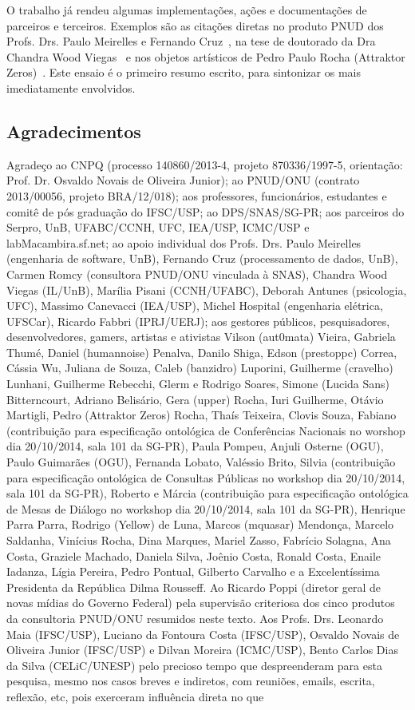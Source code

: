 \documentclass[a4paper, 11pt]{article} %
\begin{document}
O trabalho já rendeu algumas implementações, ações e documentações de parceiros e terceiros. Exemplos são as citações diretas no produto PNUD dos Profs. Drs. Paulo Meirelles e Fernando Cruz~\cite{paulo6}, na tese de doutorado da Dra Chandra Wood Viegas~\cite{chandra} e nos objetos artísticos de Pedro Paulo Rocha (Attraktor Zeros)~\cite{pedro}. Este ensaio é o primeiro resumo escrito, para sintonizar os mais imediatamente envolvidos.

\subsection*{Agradecimentos}
Agradeço ao CNPQ (processo 140860/2013-4, projeto 870336/1997-5, orientação: Prof. Dr. Osvaldo Novais de Oliveira Junior); ao PNUD/ONU (contrato 2013/00056, projeto BRA/12/018); aos professores, funcionários, estudantes e comitê de pós graduação do IFSC/USP; ao DPS/SNAS/SG-PR; aos parceiros do Serpro, UnB, UFABC/CCNH, UFC, IEA/USP, ICMC/USP e labMacambira.sf.net; ao apoio individual dos Profs. Drs. Paulo Meirelles (engenharia de software, UnB), Fernando Cruz (processamento de dados, UnB), Carmen Romcy (consultora PNUD/ONU vinculada à SNAS), Chandra Wood Viegas (IL/UnB), Marília Pisani (CCNH/UFABC), Deborah Antunes (psicologia, UFC), Massimo Canevacci (IEA/USP), Michel Hospital (engenharia elétrica, UFSCar), Ricardo Fabbri (IPRJ/UERJ); aos gestores públicos, pesquisadores, desenvolvedores, gamers, artistas e ativistas Vilson (aut0mata) Vieira, Gabriela Thumé, Daniel (humannoise) Penalva, Danilo Shiga, Edson (prestoppc) Correa, Cássia Wu, Juliana de Souza, Caleb (banzidro) Luporini, Guilherme (cravelho) Lunhani, Guilherme Rebecchi, Glerm e Rodrigo Soares, Simone (Lucida Sans) Bitterncourt, Adriano Belisário, Gera (upper) Rocha, Iuri Guilherme, Otávio Martigli, Pedro (Attraktor Zeros) Rocha, Thaís Teixeira, Clovis Souza, Fabiano (contribuição para especificação ontológica de Conferências Nacionais no worshop dia 20/10/2014, sala 101 da SG-PR), Paula Pompeu, Anjuli Osterne (OGU), Paulo Guimarães (OGU), Fernanda Lobato, Valéssio Brito, Silvia (contribuição para especificação ontológica de Consultas Públicas no workshop dia 20/10/2014, sala 101 da SG-PR), Roberto e Márcia (contribuição para especificação ontológica de Mesas de Diálogo no workshop dia 20/10/2014, sala 101 da SG-PR), Henrique Parra Parra, Rodrigo (Yellow) de Luna, Marcos (mquasar) Mendonça, Marcelo Saldanha, Vinícius Rocha, Dina Marques, Mariel Zasso, Fabrício Solagna, Ana Costa, Graziele Machado, Daniela Silva, Joênio Costa, Ronald Costa, Enaile Iadanza, Lígia Pereira, Pedro Pontual, Gilberto Carvalho e a Excelentíssima Presidenta da República Dilma Rousseff. Ao Ricardo Poppi (diretor geral de novas mídias do Governo Federal) pela supervisão criteriosa dos cinco produtos da consultoria PNUD/ONU resumidos neste texto. Aos Profs. Drs. Leonardo Maia (IFSC/USP), Luciano da Fontoura Costa (IFSC/USP), Osvaldo Novais de Oliveira Junior (IFSC/USP) e Dilvan Moreira (ICMC/USP), Bento Carlos Dias da Silva (CELiC/UNESP) pelo precioso tempo que despreenderam para esta pesquisa, mesmo nos casos breves e indiretos, com reuniões, emails, escrita, reflexão, etc, pois exerceram influência direta no que 
\end{document}
